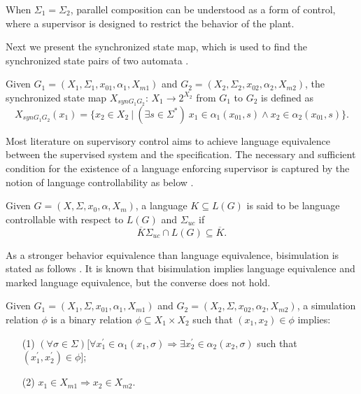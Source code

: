 \documentclass[preprint,authoryear,12pt]{elsarticle}
\begin{document}
When $\Sigma_1=\Sigma_2$, parallel composition can be understood
as a form of control, where a supervisor is designed to restrict
the behavior of the plant.

Next we present the synchronized state map, which is used to find
the synchronized state pairs of two automata
\citep{zhou2006control}.

\begin{Definition}
Given $G_1 =(X_1,\Sigma_1,x_{01},\alpha_1, X_{m1})$ and $G_2
=(X_2,\Sigma_2,x_{02},\alpha_2,X_{m2})$, the synchronized state
map $X_{synG_1G_2}$: $X_1 \rightarrow 2^{X_2}$ from $G_1$ to $G_2$
is defined as
\[
X_{synG_1G_2}(x_1)=\{x_2 \in X_2~|~(\exists s \in \Sigma^{*})~ x_1
\in \alpha_1(x_{01}, s) \wedge x_2 \in \alpha_2(x_{01}, s)\}.
\]
\end{Definition}








Most literature on supervisory control aims to achieve language
equivalence between the supervised system and the specification.
The necessary and sufficient condition for the existence of a
language enforcing supervisor is captured by the notion of
language controllability as below \citep{ramadge1987supervisory}.


\begin{Definition}\label{langc}
Given $G =(X,\Sigma,x_{0},\alpha, X_{m})$, a language $K \subseteq
L(G)$ is said to be language controllable with respect to $L(G)$
and $\Sigma_{uc}$ if
\[
\overline{K}\Sigma_{uc} \cap L(G) \subseteq \overline{K}.
\]
\end{Definition}






As a stronger behavior equivalence than language equivalence,
bisimulation is stated as follows \citep{milner1989communication}.
It is known that bisimulation implies language equivalence and
marked language equivalence, but the converse does not hold.


\begin{Definition}
Given $G_{1} =(X_{1},\Sigma,x_{01},\alpha_{1},X_{m1})$ and $G_{2}
=(X_{2},\Sigma,x_{02},\alpha_{2},X_{m2})$, a simulation relation
$\phi$ is a binary relation $\phi \subseteq X_1 \times X_2$ such
that $(x_{1}, x_{2}) \in \phi$ implies:
\begin{enumerate}
\item[(1)] $(\forall \sigma \in \Sigma)[\forall x_{1}^{'} \in
\alpha_{1}(x_{1},\sigma)\Rightarrow \exists x_{2}^{'} \in
\alpha_{2}(x_{2},\sigma)$ such that $(x_{1}^{'},x_{2}^{'}) \in
\phi]$;

\item[(2)] $x_{1} \in X_{m1} \Rightarrow x_{2} \in X_{m2}$.
\end{enumerate}
\end{Definition}
\end{document}
